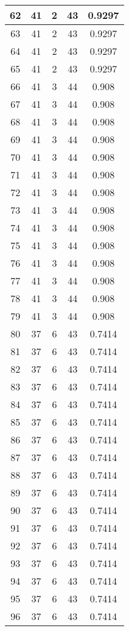 \documentclass[letterpaper, 12pt]{article}
\begin{document}
\begin{longtable}{|c|c|c|c|c|}
\hline
62 & 41 & 2 & 43 & 0.9297 \\
\hline
63 & 41 & 2 & 43 & 0.9297 \\
\hline
64 & 41 & 2 & 43 & 0.9297 \\
\hline
65 & 41 & 2 & 43 & 0.9297 \\
\hline
66 & 41 & 3 & 44 & 0.908 \\
\hline
67 & 41 & 3 & 44 & 0.908 \\
\hline
68 & 41 & 3 & 44 & 0.908 \\
\hline
69 & 41 & 3 & 44 & 0.908 \\
\hline
70 & 41 & 3 & 44 & 0.908 \\
\hline
71 & 41 & 3 & 44 & 0.908 \\
\hline
72 & 41 & 3 & 44 & 0.908 \\
\hline
73 & 41 & 3 & 44 & 0.908 \\
\hline
74 & 41 & 3 & 44 & 0.908 \\
\hline
75 & 41 & 3 & 44 & 0.908 \\
\hline
76 & 41 & 3 & 44 & 0.908 \\
\hline
77 & 41 & 3 & 44 & 0.908 \\
\hline
78 & 41 & 3 & 44 & 0.908 \\
\hline
79 & 41 & 3 & 44 & 0.908 \\
\hline
80 & 37 & 6 & 43 & 0.7414 \\
\hline
81 & 37 & 6 & 43 & 0.7414 \\
\hline
82 & 37 & 6 & 43 & 0.7414 \\
\hline
83 & 37 & 6 & 43 & 0.7414 \\
\hline
84 & 37 & 6 & 43 & 0.7414 \\
\hline
85 & 37 & 6 & 43 & 0.7414 \\
\hline
86 & 37 & 6 & 43 & 0.7414 \\
\hline
87 & 37 & 6 & 43 & 0.7414 \\
\hline
88 & 37 & 6 & 43 & 0.7414 \\
\hline
89 & 37 & 6 & 43 & 0.7414 \\
\hline
90 & 37 & 6 & 43 & 0.7414 \\
\hline
91 & 37 & 6 & 43 & 0.7414 \\
\hline
92 & 37 & 6 & 43 & 0.7414 \\
\hline
93 & 37 & 6 & 43 & 0.7414 \\
\hline
94 & 37 & 6 & 43 & 0.7414 \\
\hline
95 & 37 & 6 & 43 & 0.7414 \\
\hline
96 & 37 & 6 & 43 & 0.7414 \\

\end{longtable}
\end{document}
